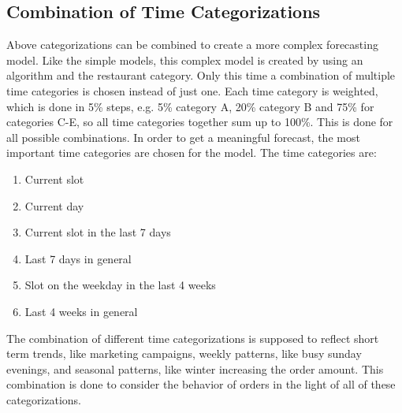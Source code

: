 \subsection{Combination of Time Categorizations}\label{subsection:Categorizing by Order}
Above categorizations can be combined to create a more complex forecasting model. Like the simple models, this complex model is created by using an algorithm and the restaurant category. Only this time a combination of multiple time categories is chosen instead of just one. Each time category is weighted, which is done in 5\% steps, e.g. 5\% category A, 20\% category B and 75\% for categories C-E, so all time categories together sum up to 100\%.  This is done for all possible combinations. In order to get a meaningful forecast, the most important time categories are chosen for the model. The time categories are:
\begin{enumerate}
\item Current slot
\item Current day
\item Current slot in the last 7 days
\item Last 7 days in general
\item Slot on the weekday in the last 4 weeks
\item Last 4 weeks in general
\end{enumerate}

The combination of different time categorizations is supposed to reflect short term trends, like marketing campaigns, weekly patterns, like busy sunday evenings, and seasonal patterns, like winter increasing the order amount.\newline
This combination is done to consider the behavior of orders in the light of all of these categorizations.
